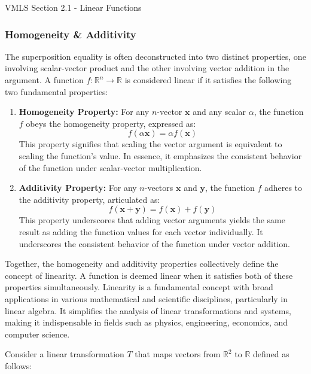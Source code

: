 \begin{notes}{VMLS Section 2.1 - Linear Functions}
    \subsubsection*{Homogeneity \& Additivity}

    The superposition equality is often deconstructed into two distinct properties, one involving scalar-vector product and the other involving vector addition in the argument. A function \(f : \mathbb{R}^n 
    \rightarrow \mathbb{R}\) is considered linear if it satisfies the following two fundamental properties:
    
    \begin{enumerate}
        \item \textbf{Homogeneity Property:} For any \(n\)-vector \(\mathbf{x}\) and any scalar \(\alpha\), the function \(f\) obeys the homogeneity property, expressed as:
        \[f(\alpha\mathbf{x}) = \alpha f(\mathbf{x})\]
        This property signifies that scaling the vector argument is equivalent to scaling the function's value. In essence, it emphasizes the consistent behavior of the function under scalar-vector multiplication.
        
        \item \textbf{Additivity Property:} For any \(n\)-vectors \(\mathbf{x}\) and \(\mathbf{y}\), the function \(f\) adheres to the additivity property, articulated as:
        \[f(\mathbf{x} + \mathbf{y}) = f(\mathbf{x}) + f(\mathbf{y})\]
        This property underscores that adding vector arguments yields the same result as adding the function values for each vector individually. It underscores the consistent behavior of the function under vector addition.
    \end{enumerate}
    
    Together, the homogeneity and additivity properties collectively define the concept of linearity. A function is deemed linear when it satisfies both of these properties simultaneously. Linearity is a fundamental 
    concept with broad applications in various mathematical and scientific disciplines, particularly in linear algebra. It simplifies the analysis of linear transformations and systems, making it indispensable in fields 
    such as physics, engineering, economics, and computer science.

    \begin{highlight}
        Consider a linear transformation \(T\) that maps vectors from \(\mathbb{R}^2\) to \(\mathbb{R}\) defined as follows:
        

\end{highlight}
\end{notes}
